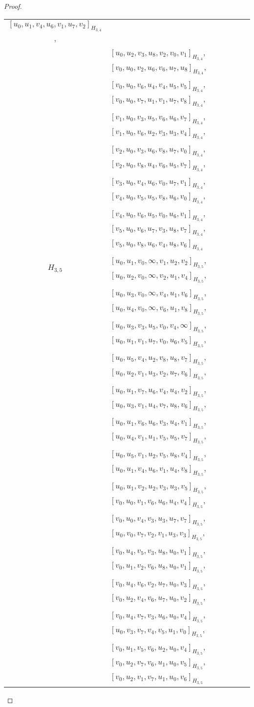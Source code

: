 \begin{subappendices}
\begin{proof}
{\begin{longtable}{|c|l|}
  $[u_0, u_1, v_4, u_6, v_1, u_7, v_2]_{H_{3,4}}$, \\* &
  $[u_0, u_2, v_3, u_8, v_2, v_0, v_1]_{H_{3,4}}$,
  $[v_0, u_0, v_2, u_6, v_6, u_7, u_8]_{H_{3,4}}$, \\* &
  $[v_0, u_0, v_6, u_4, v_4, u_5, v_5]_{H_{3,4}}$,
  $[v_0, u_0, v_7, u_1, v_1, u_7, v_8]_{H_{3,4}}$, \\* &
  $[v_1, u_0, v_3, u_5, v_6, u_6, v_7]_{H_{3,4}}$,
  $[v_1, u_0, v_6, u_2, v_3, u_3, v_4]_{H_{3,4}}$, \\* &
  $[v_2, u_0, v_3, u_6, v_8, u_7, v_0]_{H_{3,4}}$,
  $[v_2, u_0, v_8, u_4, v_6, u_5, v_7]_{H_{3,4}}$, \\* &
  $[v_3, u_0, v_4, u_6, v_0, u_7, v_1]_{H_{3,4}}$,
  $[v_4, u_0, v_5, u_5, v_8, u_6, v_0]_{H_{3,4}}$, \\* &
  $[v_4, u_0, v_6, u_5, v_0, u_6, v_1]_{H_{3,4}}$,
  $[v_5, u_0, v_6, u_7, v_3, u_8, v_7]_{H_{3,4}}$, \\* &
  $[v_5, u_0, v_8, u_6, v_4, u_8, v_6]_{H_{3,4}}$
\\ \hline
$H_{3,5}$ &
  $[u_0, u_1, v_0, \infty, v_1, u_2, v_2]_{H_{3,5}}$,
  $[u_0, u_2, v_0, \infty, v_2, u_1, v_4]_{H_{3,5}}$, \\* &
  $[u_0, u_3, v_0, \infty, v_4, u_1, v_6]_{H_{3,5}}$,
  $[u_0, u_4, v_0, \infty, v_6, u_1, v_8]_{H_{3,5}}$, \\* &
  $[u_0, u_3, v_3, u_5, v_0, v_4, \infty]_{H_{3,5}}$,
  $[u_0, u_1, v_1, u_7, v_0, u_6, v_5]_{H_{3,5}}$, \\* &
  $[u_0, u_5, v_4, u_2, v_8, u_8, v_7]_{H_{3,5}}$,
  $[u_0, u_2, v_1, u_3, v_2, u_7, v_6]_{H_{3,5}}$, \\* &
  $[u_0, u_1, v_7, u_6, v_4, u_4, v_2]_{H_{3,5}}$,
  $[u_0, u_3, v_1, u_4, v_7, u_8, v_6]_{H_{3,5}}$, \\* &
  $[u_0, u_1, v_6, u_6, v_3, u_4, v_1]_{H_{3,5}}$,
  $[u_0, u_4, v_1, u_1, v_5, u_5, v_7]_{H_{3,5}}$, \\* &
  $[u_0, u_5, v_1, u_2, v_5, u_8, v_4]_{H_{3,5}}$,
  $[u_0, u_1, v_4, u_6, v_1, u_4, v_8]_{H_{3,5}}$, \\* &
  $[u_0, u_1, v_2, u_2, v_3, u_3, v_5]_{H_{3,5}}$,
  $[v_0, u_0, v_1, v_6, u_6, u_4, v_4]_{H_{3,5}}$, \\* &
  $[v_0, u_0, v_4, v_3, u_3, u_7, v_7]_{H_{3,5}}$,
  $[u_0, v_0, v_7, v_2, v_1, u_3, v_3]_{H_{3,5}}$, \\* &
  $[v_0, u_4, v_5, v_3, u_8, u_0, v_1]_{H_{3,5}}$,
  $[v_0, u_1, v_2, v_6, u_8, u_0, v_1]_{H_{3,5}}$, \\* &
  $[v_0, u_4, v_6, v_2, u_7, u_0, v_3]_{H_{3,5}}$,
  $[v_0, u_2, v_4, v_6, u_7, u_0, v_2]_{H_{3,5}}$, \\* &
  $[v_0, u_4, v_7, v_3, u_6, u_0, v_4]_{H_{3,5}}$,
  $[u_0, v_3, v_7, v_4, v_5, u_1, v_0]_{H_{3,5}}$, \\* &
  $[v_0, u_1, v_5, v_6, u_2, u_0, v_4]_{H_{3,5}}$,
  $[v_0, u_2, v_7, v_6, u_1, u_0, v_5]_{H_{3,5}}$, \\* &
  $[v_0, u_2, v_1, v_7, u_1, u_0, v_6]_{H_{3,5}}$
\\ \hline
\end{longtable}
}
\end{proof}


\end{subappendices}
